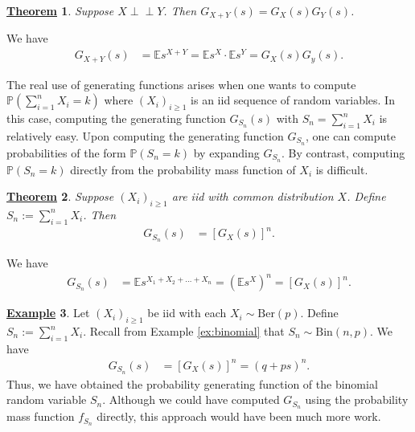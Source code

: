 \documentclass[12pt]{book}
\numberwithin{equation}{chapter}
\theoremstyle{plain}
\newtheorem{theorem}{\underline{Theorem}}
\numberwithin{theorem}{section}
\theoremstyle{definition}
\newtheorem{example}[theorem]{\underline{Example}}
\numberwithin{exercise}{chapter}
\let\oldendproof\endproof
\renewenvironment{proof}[1][\proofname]{%
  \oldproof[\scshape\underline{#1}]%
}{\oldendproof}
\newcommand{\<}{\langle}
\renewcommand{\>}{\rangle}
\renewcommand{\(}{\left(}
\renewcommand{\)}{\right)}
\renewcommand{\[}{\left[}
\renewcommand{\]}{\right]}
\newcommand\Eb{\mathds{E}}
\newcommand\Pb{\mathds{P}}
\newcommand{\ind}{\perp \! \! \! \perp}
\begin{document}
\begin{theorem}
Suppose $X \ind Y$.  Then $G_{X+Y}(s) = G_X(s) G_Y(s)$.
\end{theorem}
\begin{proof}
We have
\begin{align}
G_{X+Y}(s) 
	&= \Eb s^{X+Y} 
	=		\Eb s^X  \cdot \Eb s^Y 
	= G_X(s) G_y(s) .
\end{align}
\end{proof}

\noindent
The real use of generating functions arises when one wants to compute $\Pb( \sum_{i=1}^n X_i = k)$ where $(X_i)_{i \geq 1}$ is an iid sequence of random variables.  In this case, computing the generating function $G_{S_n}(s)$ with $S_n = \sum_{i=1}^n X_i$ is relatively easy.  Upon computing the generating function $G_{S_n}$, one can compute probabilities of the form $\Pb( S_n = k )$ by expanding $G_{S_n}$.  By contrast, computing $\Pb( S_n = k )$ directly from the probability mass function of $X_i$ is difficult.

\begin{theorem}
Suppose $(X_i)_{i \geq 1}$ are iid with common distribution $X$.  Define $S_n := \sum_{i=1}^n X_i$.  Then
\begin{align}
G_{S_n}(s)
	&=	[ G_X(s) ]^n	.
\end{align}
\end{theorem}
\begin{proof}
We have
\begin{align}
G_{S_n}(s)
	&=	\Eb s^{X_1 + X_2 + \ldots + X_n}
	=		(\Eb s^X )^n
	=		[G_X(s)]^n .
\end{align}
\end{proof}

\begin{example}
Let $(X_i)_{i \geq 1}$ be iid with each $X_i \sim \text{Ber}(p)$.  Define $S_n := \sum_{i=1}^n X_i$.  Recall from Example \ref{ex:binomial} that $S_n \sim \text{Bin}(n,p)$.  We have
\begin{align}
G_{S_n}(s)
	&=	[G_X(s)]^n = (q + p s)^n .
\end{align}
Thus, we have obtained the probability generating function of the binomial random variable $S_n$.  Although we could have computed $G_{S_n}$ using the probability mass function $f_{S_n}$ directly, this approach would have been much more work.
\end{example}
\end{document}
